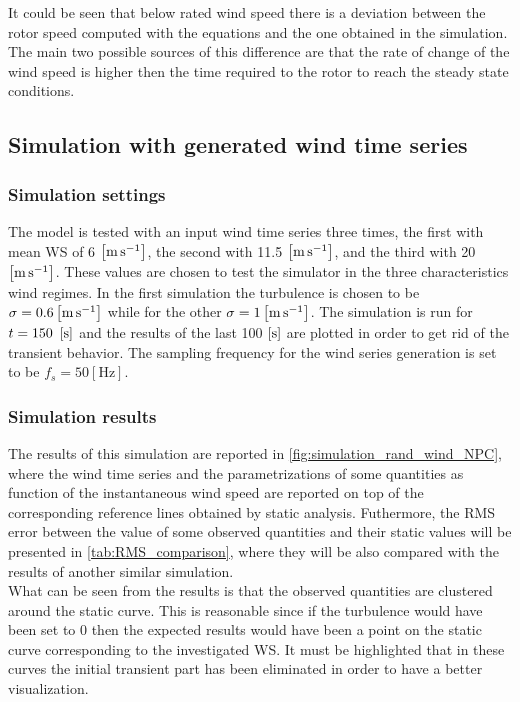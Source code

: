 

It could be seen that below rated wind speed there is a deviation between the rotor speed computed with the equations and the one obtained in the simulation. The main two possible sources of this difference are that the rate of change of the wind speed is higher then the time required to the rotor to reach the steady state conditions. 

\subsection{Simulation with generated wind time series}\label{sec:wind_series_sim}
\subsubsection{Simulation settings}
The model is tested with an input wind time series three times, the first with mean \acrshort{WS} of 6 $\left[\si{\meter\per\second}\right]$, the second with 11.5 $\left[\si{\meter\per\second}\right]$, and the third with 20 $\left[\si{\meter\per\second}\right]$. These values are chosen to test the simulator in the three characteristics wind regimes. In the first simulation the turbulence is chosen to be $\sigma=0.6 \left[\si{\meter\per\second}\right]$ while for the other $\sigma=1 \left[\si{\meter\per\second}\right]$. The simulation is run for $t=150\ \left[\si{\second}\right]$ and the results of the last 100 $\left[\si{\second}\right]$ are plotted in order to get rid of the transient behavior. The sampling frequency for the wind series generation is set to be $f_s=50 \left[\si{\hertz}\right]$.

\subsubsection{Simulation results}
The results of this simulation are reported in \autoref{fig:simulation_rand_wind_NPC}, where the wind time series and the parametrizations of some quantities as function of the instantaneous wind speed are reported on top of the corresponding reference lines obtained by static analysis. Futhermore, the \acrfull{RMS} error between the value of some observed quantities and their static values will be presented in \autoref{tab:RMS_comparison}, where they will be also compared with the results of another similar simulation. \\
What can be seen from the results is that the observed quantities are clustered around the static curve. This is reasonable since if the turbulence would have been set to 0 then the expected results would have been a point on the static curve corresponding to the investigated WS. It must be highlighted that in these curves the initial transient part has been eliminated in order to have a better visualization. 

